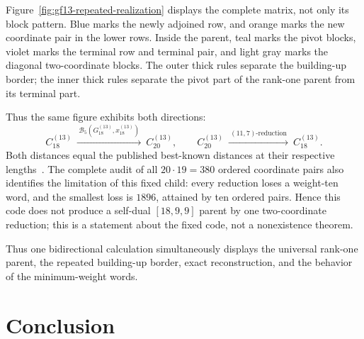 \documentclass[12pt]{article}
\begin{document}
\begin{samepage}
Figure~\ref{fig:gf13-repeated-realization} displays the complete matrix, not
only its block pattern.  Blue marks the newly adjoined row, and orange marks
the new coordinate pair in the lower rows.  Inside the parent, teal marks
the pivot blocks, violet marks the terminal row and terminal pair, and light
gray marks the diagonal two-coordinate blocks.  The outer thick rules
separate the building-up border; the inner thick rules separate the pivot
part of the rank-one parent from its terminal part.

\begin{center}
\centering
{}
\label{fig:gf13-repeated-realization}
\end{center}
\end{samepage}

Thus the same figure exhibits both directions:
\[
C_{18}^{(13)}
\ \xrightarrow{\ \mathcal B_5(G_{18}^{(13)},x_{18}^{(13)})\ }\
C_{20}^{(13)},
\qquad
C_{20}^{(13)}
\ \xrightarrow{\ (11,7)\text{-reduction}\ }\
C_{18}^{(13)}.
\]
Both distances equal the published best-known distances at their respective
lengths~\cite{KimChoi2021,BetsumiyaEtAl}.  The complete audit of all
\(20\cdot19=380\) ordered coordinate
pairs also identifies the limitation of this fixed child: every reduction
loses a weight-ten word, and the smallest loss is \(1896\), attained by ten
ordered pairs.  Hence this code does not produce a self-dual
\([18,9,9]\) parent by one two-coordinate reduction; this is a statement
about the fixed code, not a nonexistence theorem.

Thus one bidirectional calculation simultaneously displays the universal
rank-one parent, the repeated building-up border, exact reconstruction, and
the behavior of the minimum-weight words.
\section{Conclusion}
\label{sec:conclusion}
\end{document}
